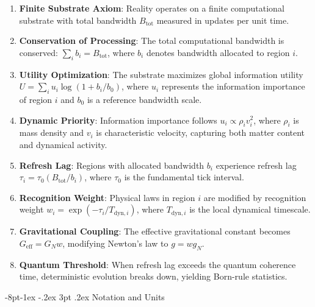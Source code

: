 \documentclass[12pt,letterpaper]{book}
\makeatletter
\renewcommand\subsection{\@startsection{subsection}{2}{\z@}%
                {-8pt\@plus -1ex \@minus -.2ex}%
                {3pt \@plus .2ex}%
                {\normalfont\normalsize\bfseries}}
\makeatother
\begin{document}
\begin{enumerate}
\item \textbf{Finite Substrate Axiom}: Reality operates on a finite computational substrate with total bandwidth $B_{\text{tot}}$ measured in updates per unit time.

\item \textbf{Conservation of Processing}: The total computational bandwidth is conserved: $\sum_i b_i = B_{\text{tot}}$, where $b_i$ denotes bandwidth allocated to region $i$.

\item \textbf{Utility Optimization}: The substrate maximizes global information utility $U = \sum_i u_i \log(1 + b_i/b_0)$, where $u_i$ represents the information importance of region $i$ and $b_0$ is a reference bandwidth scale.

\item \textbf{Dynamic Priority}: Information importance follows $u_i \propto \rho_i v_i^2$, where $\rho_i$ is mass density and $v_i$ is characteristic velocity, capturing both matter content and dynamical activity.

\item \textbf{Refresh Lag}: Regions with allocated bandwidth $b_i$ experience refresh lag $\tau_i = \tau_0(B_{\text{tot}}/b_i)$, where $\tau_0$ is the fundamental tick interval.

\item \textbf{Recognition Weight}: Physical laws in region $i$ are modified by recognition weight $w_i = \exp(-\tau_i/T_{\text{dyn},i})$, where $T_{\text{dyn},i}$ is the local dynamical timescale.

\item \textbf{Gravitational Coupling}: The effective gravitational constant becomes $G_{\text{eff}} = G_N w$, modifying Newton's law to $g = w g_N$.

\item \textbf{Quantum Threshold}: When refresh lag exceeds the quantum coherence time, deterministic evolution breaks down, yielding Born-rule statistics.
\end{enumerate}

\subsection{Notation and Units}
\end{document}
